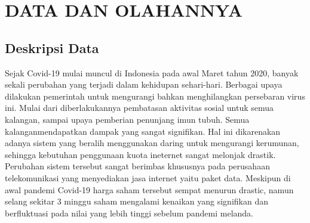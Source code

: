 \chapter{DATA DAN OLAHANNYA}
\section{Deskripsi Data}
Sejak Covid-19 mulai muncul di Indonesia pada awal Maret tahun 2020, banyak sekali perubahan yang terjadi dalam kehidupan sehari-hari. Berbagai upaya dilakukan pemerintah untuk mengurangi bahkan menghilangkan persebaran virus ini. Mulai dari diberlakukannya pembatasan aktivitas sosial untuk semua kalangan, sampai upaya pemberian penunjang imun tubuh. Semua kalanganmendapatkan dampak yang sangat signifikan. Hal ini dikarenakan adanya sistem yang beralih menggunakan daring untuk mengurangi kerumunan, sehingga kebutuhan penggunaan kuota ineternet sangat melonjak drastik. Perubahan sistem tersebut sangat berimbas khususnya pada perusahaan telekomunikasi yang menyediakan jasa internet yaitu paket data. Meskipun di awal pandemi Covid-19 harga saham tersebut sempat menurun drastic, namun selang sekitar 3 minggu saham mengalami kenaikan yang signifikan dan berfluktuasi pada nilai yang lebih tinggi sebelum pandemi melanda.